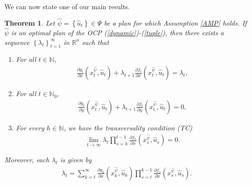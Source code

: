 \documentclass[3p]{elsarticle}
\newcommand{\rzn}{\mathbb R^{n}}
\newcommand{\nat}{\mathbb N_0}
\newcommand{\natu}{\mathbb N}
\newtheorem{thm}{Theorem}
\begin{document}
	We can now state one of our main results.
	\begin{thm}\label{MP}
		Let $\hat \psi=\left\lbrace\hat u_t \right\rbrace \in\Psi$ be a plan for which Assumption \ref{AMP} holds. If $\hat\psi$ is an optimal plan of the OCP (\ref{dynamic})-(\ref{tuple}), then there exists a sequence $\left\lbrace \lambda_t\right\rbrace_{t=1}^\infty$ in $\rzn$ such that
		\begin{enumerate}
			\item[(a)] For all $t\in\natu$,
			\begin{align}\label{MPX}
			\frac{\partial g_t}{\partial x}(x_t^{\hat\psi},\hat u_t)+\lambda_{t+1}\frac{\partial f_t}{\partial x}(x_t^{\hat\psi},\hat u_t)=\lambda_t,
			\end{align}
			\item[(b)] For all $t\in\nat$,
			\begin{align}\label{MPY}
			\frac{\partial g_t}{\partial y}(x_t^{\hat\psi},\hat u_t)+\lambda_{t+1}\frac{\partial f_t}{\partial y}(x_t^{\hat\psi},\hat u_t)=0,
			\end{align}
			\item[(c)] For every $h\in\natu$, we have the  transversality condition (TC)
			\begin{align}\label{TC}
			\lim_{t\to\infty}\lambda_t \prod_{s=h}^{t-1}\frac{\partial f_s}{\partial x}(x_s^{\hat\psi},\hat u_s)=0.
			\end{align}  
		\end{enumerate}
		Moreover, each $\lambda_t$ is given by 
		\begin{align}\label{multipliers}
		\lambda_t=\sum_{k=t}^\infty\frac{\partial g_k}{\partial x}(x_k^{\hat{\psi}},\hat u_k)\prod_{s=t}^{k-1}\frac{\partial f_s}{\partial x}(x_s^{\hat{\psi}},\hat u_s).
		\end{align}
	\end{thm}
\end{document}
